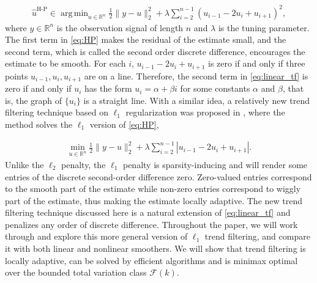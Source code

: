 \documentclass[a4paper]{article}
\DeclareMathOperator*{\argmin}{arg\,min}
\newcommand{\RR}{\mathbb{R}}
\renewcommand{\cal}{\mathcal}
\begin{document}
\begin{align}
\hat{u}^{\text{H-P}} \in \argmin_{u\in\RR^n} \frac{1}{2}\|y-u\|_2^2 +\lambda\sum_{i=2}^{n-1}(u_{i-1}-2u_i+u_{i+1})^2,
\label{eq:HP}
\end{align}
where $y\in\RR^n$ is the observation signal of length $n$ and $\lambda$ is the tuning parameter. The first term in \eqref{eq:HP} makes the residual of the estimate small, and the second term, which is called the second order discrete difference, encourages the estimate to be smooth. For each $i$, $u_{i-1} - 2u_i + u_{i+1}$ is zero if and only if three points $u_{i-1}, u_i, u_{i+1}$ are on a line. Therefore, the second term in \eqref{eq:linear_tf} is zero if and only if $u_i$ has the form $u_i = \alpha + \beta i$ for some constants $\alpha$ and $\beta$, that is, the graph of $\{u_i\}$ is a straight line. With a similar idea, a relatively new trend filtering technique based on $\ell_1$ regularization was proposed in \cite{kim2009ell_1}, where the method solves the $\ell_1$ version of \eqref{eq:HP},

\begin{align}
\min_{u\in\RR^n} \frac{1}{2}\|y-u\|_2^2 + \lambda\sum_{i=2}^{n-1} |u_{i-1} - 2u_i + u_{i+1}|. \label{eq:linear_tf}
\end{align}
Unlike the $\ell_2$ penalty, the $\ell_1$ penalty is sparsity-inducing and will render some entries of the discrete second-order difference zero. Zero-valued entries correspond to the smooth part of the estimate while non-zero entries correspond to wiggly part of the estimate, thus making the estimate locally adaptive. The new trend filtering technique discussed here is a natural extension of \eqref{eq:linear_tf} and penalizes any order of discrete difference. Throughout the paper, we will work through and explore this more general version of $\ell_1$ trend filtering, and compare it with both linear and nonlinear smoothers. We will show that trend filtering is locally adaptive, can be solved by efficient algorithms and is minimax optimal over the bounded total variation class $\cal{F}(k)$.
\end{document}

